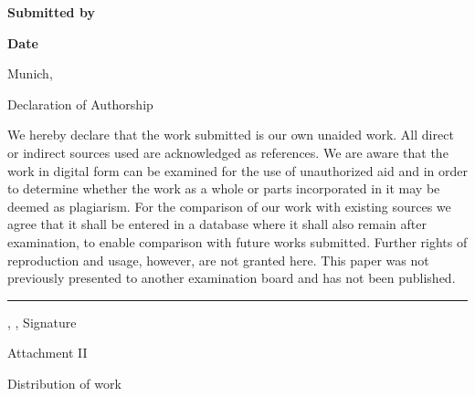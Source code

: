 \vspace*{4.3mm}
\textbf{Submitted by}\tab
\begin{minipage}[t]{\textwidth-\CurrentLineWidth}
\EingereichtVon
\end{minipage}

\vspace*{-1mm}
\textbf{Date}\tab 
\begin{minipage}[t]{\textwidth-\CurrentLineWidth}
Munich, \Datum\strut
\end{minipage}

\newpage

\vspace*{-15.8mm}
\fontsize{19pt}{21pt}\selectfont
\ErklaerungUeberschrift

\vspace{25.3mm}
Declaration of Authorship

\normalsize\selectfont
\vspace{13.2mm}
We hereby declare that the work submitted is our own unaided work. All direct or indirect sources used are acknowledged as references.
We are aware that the work in digital form can be examined for the use of unauthorized aid and in order to determine whether the work as a whole or parts incorporated in it may be deemed as plagiarism. For the comparison of our work with existing sources we agree that it shall be entered in a database where it shall also remain
after examination, to enable comparison with future works submitted. Further rights
of reproduction and usage, however, are not granted here.
This paper was not previously presented to another examination board and has not
been published.

\vspace{18.1mm}
\rule[-3.7mm]{\linewidth}{0.5pt}
\Ort{}, \Datum{}, Signature

\newpage

\vspace*{-15.8mm}
\fontsize{19pt}{21pt}\selectfont
Attachment II

\vspace{25.3mm}
Distribution of work

